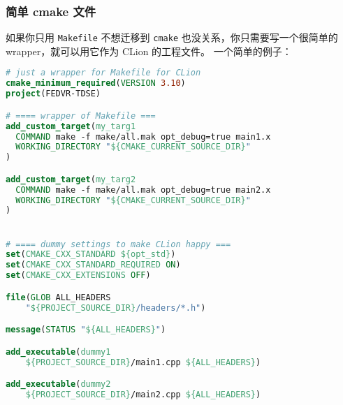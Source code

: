 
\begin{issues}
\issueDraft
\end{issues}

\subsubsection{简单 cmake 文件}
如果你只用 \verb|Makefile| 不想迁移到 \verb|cmake| 也没关系，你只需要写一个很简单的 wrapper，就可以用它作为 CLion 的工程文件。 一个简单的例子：
\begin{lstlisting}[language=cmake]
# just a wrapper for Makefile for CLion
cmake_minimum_required(VERSION 3.10)
project(FEDVR-TDSE)

# ==== wrapper of Makefile ===
add_custom_target(my_targ1
  COMMAND make -f make/all.mak opt_debug=true main1.x
  WORKING_DIRECTORY "${CMAKE_CURRENT_SOURCE_DIR}"
)

add_custom_target(my_targ2
  COMMAND make -f make/all.mak opt_debug=true main2.x
  WORKING_DIRECTORY "${CMAKE_CURRENT_SOURCE_DIR}"
)


# ==== dummy settings to make CLion happy ===
set(CMAKE_CXX_STANDARD ${opt_std})
set(CMAKE_CXX_STANDARD_REQUIRED ON)
set(CMAKE_CXX_EXTENSIONS OFF)

file(GLOB ALL_HEADERS
    "${PROJECT_SOURCE_DIR}/headers/*.h")

message(STATUS "${ALL_HEADERS}")

add_executable(dummy1
    ${PROJECT_SOURCE_DIR}/main1.cpp ${ALL_HEADERS})

add_executable(dummy2
    ${PROJECT_SOURCE_DIR}/main2.cpp ${ALL_HEADERS})
\end{lstlisting}

